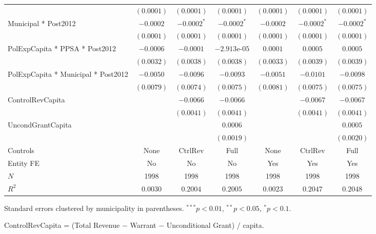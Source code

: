 \begin{table}[H]
\begin{minipage}{\textwidth}
\begin{tabular}{lcccccc}
         & $(0.0001)$ & $(0.0001)$ & $(0.0001)$ & $(0.0001)$ & $(0.0001)$ & $(0.0001)$ \\[4pt]
        Municipal * Post2012 & $-0.0002$ & $-0.0002^{*}$ & $-0.0002^{*}$ & $-0.0002$ & $-0.0002^{*}$ & $-0.0002^{*}$ \\
         & $(0.0001)$ & $(0.0001)$ & $(0.0001)$ & $(0.0001)$ & $(0.0001)$ & $(0.0001)$ \\[4pt]
        PolExpCapita * PPSA * Post2012 & $-0.0006$ & $-0.0001$ & $-2.913\text{e-}05$ & $0.0001$ & $0.0005$ & $0.0005$ \\
         & $(0.0032)$ & $(0.0038)$ & $(0.0038)$ & $(0.0033)$ & $(0.0039)$ & $(0.0039)$ \\[4pt]
        PolExpCapita * Municipal * Post2012 & $-0.0050$ & $-0.0096$ & $-0.0093$ & $-0.0051$ & $-0.0101$ & $-0.0098$ \\
         & $(0.0079)$ & $(0.0074)$ & $(0.0075)$ & $(0.0081)$ & $(0.0075)$ & $(0.0075)$ \\[4pt]
        ControlRevCapita &  & $-0.0066$ & $-0.0066$ &  & $-0.0067$ & $-0.0067$ \\
         &  & $(0.0041)$ & $(0.0041)$ &  & $(0.0041)$ & $(0.0041)$ \\[4pt]
        UncondGrantCapita &  &  & $0.0006$ &  &  & $0.0005$ \\
         &  &  & $(0.0019)$ &  &  & $(0.0020)$ \\[4pt]
        \midrule
        Controls & None & CtrlRev & Full & None & CtrlRev & Full \\
        Entity FE & No & No & No & Yes & Yes & Yes \\
        $N$ & 1998 & 1998 & 1998 & 1998 & 1998 & 1998 \\
        $R^2$ & $0.0030$ & $0.2004$ & $0.2005$ & $0.0023$ & $0.2047$ & $0.2048$ \\
        \bottomrule
    \end{tabular}

    \vspace{6pt}
    {\scriptsize Standard errors clustered by municipality in parentheses. $^{***}p<0.01$, $^{**}p<0.05$, $^{*}p<0.1$.}

    {\scriptsize ControlRevCapita = (Total Revenue $-$ Warrant $-$ Unconditional Grant) / capita.}
    \end{minipage}
\end{table}